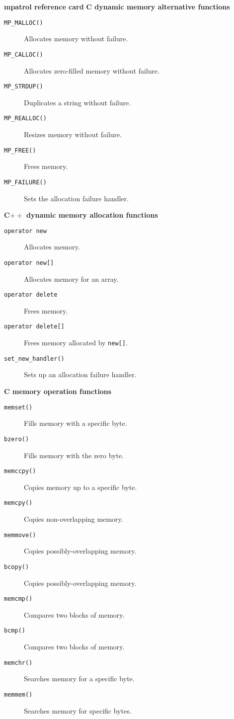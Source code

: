 \documentclass[a4paper,landscape,final]{article}
\newcommand{\heading}[1]{\textbf{\normalsize #1}}
\newcommand{\function}[1]{\texttt{#1()}}
\begin{document}
\begin{multicols}{3}{\textbf{\Large mpatrol reference card}}
\vskip 12pt
\heading{C dynamic memory alternative functions}
\vskip 6pt

\begin{description}
\item[\function{MP\_MALLOC}]
\hfill Allocates memory without failure.
\item[\function{MP\_CALLOC}]
\hfill Allocates zero-filled memory without failure.
\item[\function{MP\_STRDUP}]
\hfill Duplicates a string without failure.
\item[\function{MP\_REALLOC}]
\hfill Resizes memory without failure.
\item[\function{MP\_FREE}]
\hfill Frees memory.
\item[\function{MP\_FAILURE}]
\hfill Sets the allocation failure handler.
\end{description}

\vskip 12pt
\heading{C$++$ dynamic memory allocation functions}
\vskip 6pt

\begin{description}
\item[\texttt{operator new}]
\hfill Allocates memory.
\item[\texttt{operator new[]}]
\hfill Allocates memory for an array.
\item[\texttt{operator delete}]
\hfill Frees memory.
\item[\texttt{operator delete[]}]
\hfill Frees memory allocated by \texttt{new[]}.
\item[\function{set\_new\_handler}]
\hfill Sets up an allocation failure handler.
\end{description}

\vskip 12pt
\heading{C memory operation functions}
\vskip 6pt

\begin{description}
\item[\function{memset}]
\hfill Fills memory with a specific byte.
\item[\function{bzero}]
\hfill Fills memory with the zero byte.
\item[\function{memccpy}]
\hfill Copies memory up to a specific byte.
\item[\function{memcpy}]
\hfill Copies non-overlapping memory.
\item[\function{memmove}]
\hfill Copies possibly-overlapping memory.
\item[\function{bcopy}]
\hfill Copies possibly-overlapping memory.
\item[\function{memcmp}]
\hfill Compares two blocks of memory.
\item[\function{bcmp}]
\hfill Compares two blocks of memory.
\item[\function{memchr}]
\hfill Searches memory for a specific byte.
\item[\function{memmem}]
\hfill Searches memory for specific bytes.
\end{description}


\end{multicols}
\end{document}
